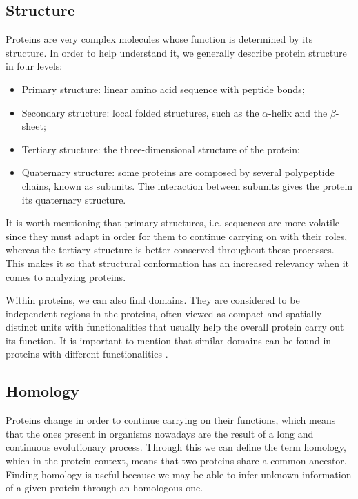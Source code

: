 \subsection{Structure}
Proteins are very complex molecules whose function is determined by its structure. In order to help understand it, we generally describe protein structure in four levels:

\begin{itemize}
 	\item Primary structure: linear amino acid sequence with peptide bonds;
 	\item Secondary structure: local folded structures, such as the $\alpha$-helix and the $\beta$-sheet;
 	\item Tertiary structure: the three-dimensional structure of the protein;
 	\item Quaternary structure: some proteins are composed by several polypeptide chains, known as subunits. The interaction between subunits gives the protein its quaternary structure.
\end{itemize}

It is worth mentioning that primary structures, i.e. sequences are more volatile since they must adapt in order for them to continue carrying on with their roles, whereas the tertiary structure is better conserved throughout these processes. This makes it so that structural conformation has an increased relevancy when it comes to analyzing proteins.

Within proteins, we can also find domains. They are considered to be independent regions in the proteins, often viewed as compact and spatially distinct units with functionalities that usually help the overall protein carry out its function. It is important to mention that similar domains can be found in proteins with different functionalities \cite{ponting2002natural}. 

\subsection{Homology}

Proteins change in order to continue carrying on their functions, which means that the ones present in organisms nowadays are the result of a long and continuous evolutionary process. Through this we can define the term homology, which in the protein context, means that two proteins share a common ancestor. Finding homology is useful because we may be able to infer unknown information of a given protein through an homologous one.

